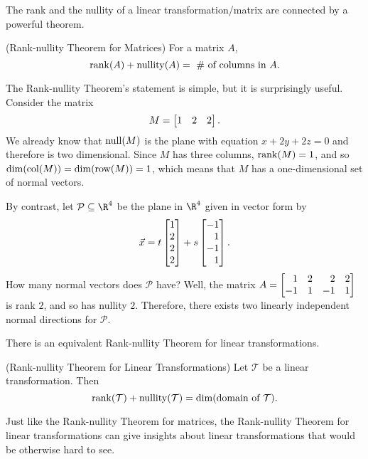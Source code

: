 
The rank and the nullity of a linear transformation/matrix are connected by a powerful theorem.

\begin{theorem}(Rank-nullity Theorem for Matrices) For a matrix $A$,
\[
	\operatorname{rank}(A)+\operatorname{nullity}(A)=\ \#\text{ of columns in $A$}.
\]
\end{theorem}

The Rank-nullity Theorem's statement is simple, but it is surprisingly useful. Consider
the matrix \[M=\mat{1&2&2}.\] We already know that $\operatorname{null}(M)$ is the plane with equation
$x+2y+2z=0$ and therefore is two dimensional. Since $M$ has three columns, $\operatorname{rank}(M)=1$, and
so $\operatorname{dim}(\operatorname{col}(M))=\operatorname{dim}(\operatorname{row}(M))=1$, which means that $M$ has a one-dimensional set of normal vectors.

By contrast, let $\mathcal P\subseteq \R^4$ be the plane in $\R^4$ given in vector form by
\[
	\vec x=t\mat{1\\2\\2\\2}+s\mat{-1\\1\\-1\\1}.
\]
How many normal vectors does $\mathcal P$ have? Well, the matrix $A=\mat{1&2&2&2\\-1&1&-1&1}$ is rank $2$,
and so has nullity $2$. Therefore, there exists two linearly independent normal directions for $\mathcal P$.

There is an equivalent Rank-nullity Theorem for linear transformations.
\begin{theorem}(Rank-nullity Theorem for Linear Transformations) Let $\mathcal T$ be a linear transformation.
Then
\[
	\operatorname{rank}(\mathcal T)+\operatorname{nullity}(\mathcal T)=\operatorname{dim}(\text{domain of $\mathcal T$}).
\]
\end{theorem}

Just like the Rank-nullity Theorem for matrices, the Rank-nullity Theorem for linear transformations
can give insights about linear transformations that would be otherwise hard to see.

